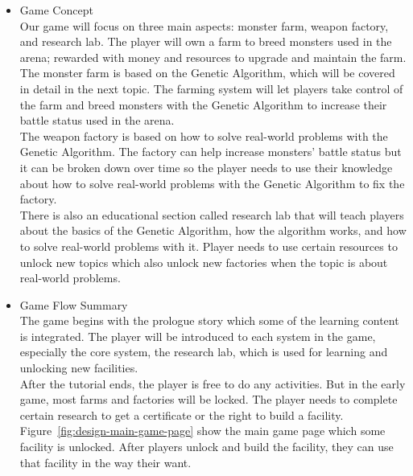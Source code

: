 \documentclass[12pt,oneside,openright,a4paper]{cpe-english-project}
\begin{document}
\begin{itemize}

\item Game Concept \\
	Our game will focus on three main aspects: monster farm, weapon factory, and research lab. The player will own a farm to breed monsters used in the arena; rewarded with money and resources to upgrade and maintain the farm. \\
	The monster farm is based on the Genetic Algorithm, which will be covered in detail in the next topic. The farming system will let players take control of the farm and breed monsters with the Genetic Algorithm to increase their battle status used in the arena. \\
	The weapon factory is based on how to solve real-world problems with the Genetic Algorithm. The factory can help increase monsters’ battle status but it can be broken down over time so the player needs to use their knowledge about how to solve real-world problems with the Genetic Algorithm to fix the factory. \\
 	There is also an educational section called research lab that will teach players about the basics of the Genetic Algorithm, how the algorithm works, and how to solve real-world problems with it. Player needs to use certain resources to unlock new topics which also unlock new factories when the topic is about real-world problems.


\item Game Flow Summary \\
	The game begins with the prologue story which some of the learning content is integrated. The player will be introduced to each system in the game, especially the core system, the research lab, which is used for learning and unlocking new facilities. \\
	After the tutorial ends, the player is free to do any activities. But in the early game, most farms and factories will be locked. The player needs to complete certain research to get a certificate or the right to build a facility. Figure~\ref{fig:design-main-game-page} show the main game page which some facility is unlocked. After players unlock and build the facility, they can use that facility in the way their want.

\begin{minipage}[c]{\textwidth}\centering
{}
\label{fig:design-main-game-page}
\end{minipage}



\end{itemize}
\end{document}
